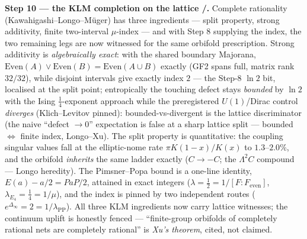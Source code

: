 \par\smallskip\noindent\textbf{Step 10 --- the KLM completion on the lattice \mE/\mC.} Complete
rationality (Kawahigashi--Longo--M\"uger) has three ingredients --- split property, strong
additivity, finite two-interval $\mu$-index --- and with Step 8 supplying the index, the two
remaining legs are now witnessed for the same orbifold prescription. Strong additivity is
\emph{algebraically exact}: with the shared boundary Majorana,
$\mathrm{Even}(A)\vee\mathrm{Even}(B)=\mathrm{Even}(A\cup B)$ exactly (GF2 spans full, matrix rank
$32/32$), while disjoint intervals give exactly index $2$ --- the Step-8 $\ln2$ bit, localised at
the split point; entropically the touching defect stays \emph{bounded} by $\ln2$ with the Ising
$\tfrac14$-exponent approach while the preregistered $U(1)$/Dirac control \emph{diverges}
(Klich--Levitov pinned): bounded-vs-divergent is the lattice discriminator (the naive
``defect $\to0$'' expectation is false at a sharp lattice split --- bounded $\Leftrightarrow$
finite index, Longo--Xu). The split property is quantitative: the coupling singular values fall at
the elliptic-nome rate $\pi K(1-x)/K(x)$ to $1.3$--$2.0\%$, and the orbifold \emph{inherits} the
same ladder exactly ($C\to-C$; the $\Lambda^2C$ compound --- Longo heredity). The Pimsner--Popa
bound is a one-line identity, $E(a)-a/2=PaP/2$, attained in exact integers
($\lambda=\tfrac12=1/[F:F_{\mathrm{even}}]$, $\lambda_{E_4}=\tfrac14=1/\mu$), and the index is
pinned by two independent routes ($e^{\Delta_\infty}=2=1/\lambda_{\mathrm{PP}}$). All three KLM
ingredients now carry lattice witnesses; the continuum uplift is honestly fenced --- ``finite-group
orbifolds of completely rational nets are completely rational'' is \emph{Xu's theorem}, cited, not
claimed. 

